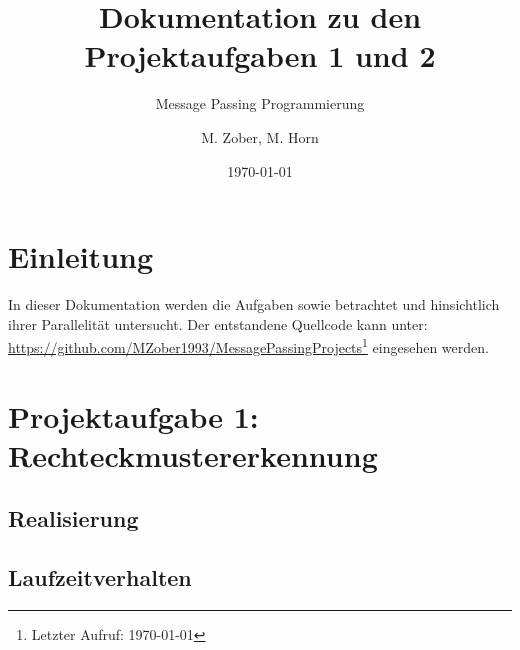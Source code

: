 	

\usepackage{pgfplots}

\usepackage{filecontents}
					
\title{Dokumentation zu den Projektaufgaben 1 und 2}
\subtitle{Message Passing Programmierung\vspace{1cm}}

\author{M. Zober, M. Horn}
\date{\today}

\maketitle

\tableofcontents
\pagebreak

\section{Einleitung}
In dieser Dokumentation werden die Aufgaben  sowie  betrachtet und hinsichtlich ihrer Parallelität untersucht.
Der entstandene Quellcode kann unter:\\
\url{https://github.com/MZober1993/MessagePassingProjects}\footnote{Letzter Aufruf: \today}
eingesehen werden.
\section{Projektaufgabe 1: Rechteckmustererkennung}

\subsection{Realisierung}


\subsection{Laufzeitverhalten}


